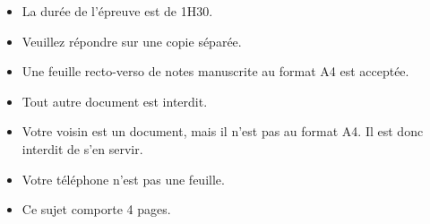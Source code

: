 \documentclass[10pt]{article}
\begin{document}
\maketitle
\lstset{frame=single, numbers=none}

\vspace{1cm}
{
\begin{itemize}
\item La durée de l'épreuve est de 1H30.
\item Veuillez répondre sur une copie séparée.
\item Une feuille recto-verso de notes manuscrite au format A4 est acceptée.
\item Tout autre document est interdit.
\item Votre voisin est un document, mais il n'est pas au format A4. Il est donc interdit de s'en servir.
\item Votre téléphone n'est pas une feuille.
\item Ce sujet comporte 4 pages.
\end{itemize}
}






\end{document}
